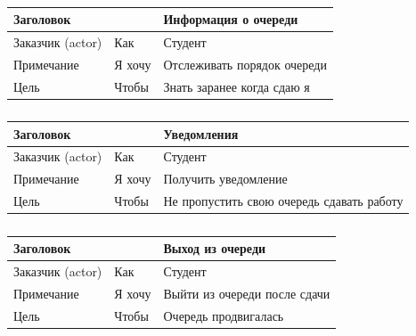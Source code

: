 \begin{table}[h!tp]
	\centering
	\caption{}
	\label{table:user_story:info:stud}
	\begin{tabular}{|l|l|l|}
		\hline \multicolumn{2}{|l|}{Заголовок} & Информация о очереди\\ \hline
		Заказчик (actor) & Как & Студент \\ \hline
		Примечание & Я хочу & Отслеживать порядок очереди\\ \hline
		Цель & Чтобы & Знать заранее когда сдаю я\\ \hline
	\end{tabular}
\end{table}
\begin{table}[h!tp]
	\centering
	\caption{}
	\label{table:user_story:notify}
	\begin{tabular}{|l|l|l|}
		\hline \multicolumn{2}{|l|}{Заголовок} & Уведомления\\ \hline
		Заказчик (actor) & Как & Студент \\ \hline
		Примечание & Я хочу & Получить уведомление\\ \hline
		Цель & Чтобы & Не пропустить свою очередь сдавать работу\\ \hline
	\end{tabular}
\end{table}
\begin{table}[h!tp]
	\centering
	\caption{}
	\label{table:user_story:exit}
	\begin{tabular}{|l|l|l|}
		\hline \multicolumn{2}{|l|}{Заголовок} & Выход из очереди\\ \hline
		Заказчик (actor) & Как & Студент \\ \hline
		Примечание & Я хочу & Выйти из очереди после сдачи\\ \hline
		Цель & Чтобы & Очередь продвигалась\\ \hline
	\end{tabular}
\end{table}

\break

